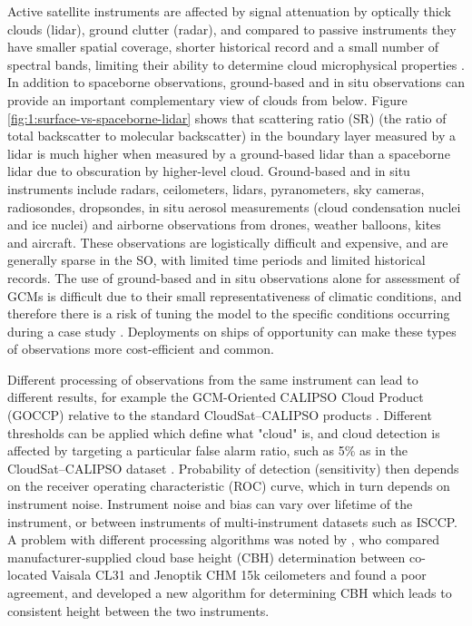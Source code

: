 Active satellite instruments are affected by signal attenuation by
optically thick
clouds (lidar), ground clutter (radar), and compared to passive instruments they have smaller spatial coverage,
shorter historical record and a small number of spectral bands, limiting their
ability to determine cloud microphysical properties \citep{noh2017,mace2018a,mace2018b,gettelman2020}.
In addition to spaceborne observations, ground-based and in situ
observations can provide an important complementary view of clouds from below.
Figure \ref{fig:1:surface-vs-spaceborne-lidar} shows that scattering ratio (SR)
(the ratio of total backscatter to molecular backscatter)
in the boundary layer measured by a lidar is much higher when measured by 
a ground-based lidar than a spaceborne lidar due to obscuration by higher-level
cloud.
Ground-based and in situ instruments include radars, ceilometers, lidars,
pyranometers, sky cameras, radiosondes, dropsondes, in situ aerosol measurements
(cloud condensation nuclei and ice nuclei) and airborne observations from
drones, weather balloons, kites and aircraft. These observations are logistically
difficult and expensive, and are generally sparse in the SO, with
limited time periods and limited historical records. The use of ground-based and
in situ observations alone for assessment of GCMs is difficult due to their
small representativeness of climatic conditions, and therefore there
is a risk of tuning the model to the specific conditions occurring during a
case study \citep{jakob2003}. Deployments on ships of opportunity can make these types
of observations more cost-efficient and common.

Different processing of observations from the same instrument can lead
to different results, for example the
GCM-Oriented CALIPSO Cloud Product (GOCCP) relative to the standard
CloudSat--CALIPSO products \citep{chepfer2010}.
Different thresholds can be applied which define what "cloud" is,
and cloud detection is affected by targeting a particular false alarm ratio,
such as 5\% as in the CloudSat--CALIPSO dataset \citep{hagihara2010}.
Probability of detection (sensitivity) then depends on the receiver operating
characteristic (ROC) curve, which in turn depends on instrument
noise. Instrument noise and bias can vary over lifetime of the instrument,
or between instruments of multi-instrument datasets such as ISCCP.
A problem with different processing
algorithms was noted by \cite{martucci2010}, who compared
manufacturer-supplied cloud base height (CBH)
determination between co-located Vaisala CL31 and Jenoptik CHM 15k ceilometers
and found a poor agreement, and developed a new algorithm for determining
CBH which leads to consistent height between the two instruments.

